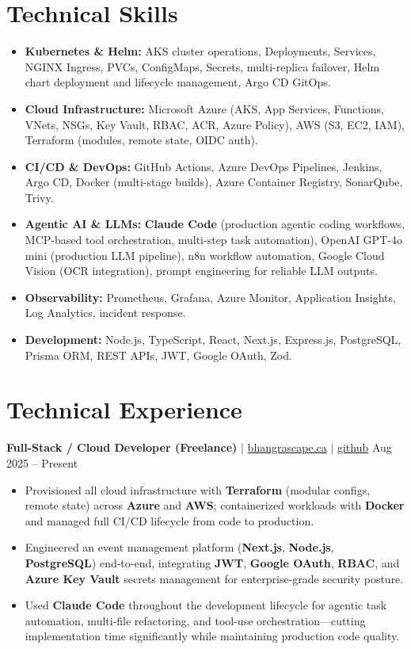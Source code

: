 \documentclass[11pt,a4paper]{article}
\begin{document}
\section{Technical Skills}
\begin{itemize}
    \item \textbf{Kubernetes \& Helm:} AKS cluster operations, Deployments, Services, NGINX Ingress, PVCs, ConfigMaps, Secrets, multi-replica failover, Helm chart deployment and lifecycle management, Argo CD GitOps.
    \item \textbf{Cloud Infrastructure:} Microsoft Azure (AKS, App Services, Functions, VNets, NSGs, Key Vault, RBAC, ACR, Azure Policy), AWS (S3, EC2, IAM), Terraform (modules, remote state, OIDC auth).
    \item \textbf{CI/CD \& DevOps:} GitHub Actions, Azure DevOps Pipelines, Jenkins, Argo CD, Docker (multi-stage builds), Azure Container Registry, SonarQube, Trivy.
    \item \textbf{Agentic AI \& LLMs:} \textbf{Claude Code} (production agentic coding workflows, MCP-based tool orchestration, multi-step task automation), OpenAI GPT-4o mini (production LLM pipeline), n8n workflow automation, Google Cloud Vision (OCR integration), prompt engineering for reliable LLM outputs.
    \item \textbf{Observability:} Prometheus, Grafana, Azure Monitor, Application Insights, Log Analytics, incident response.
    \item \textbf{Development:} Node.js, TypeScript, React, Next.js, Express.js, PostgreSQL, Prisma ORM, REST APIs, JWT, Google OAuth, Zod.
\end{itemize}

\section{Technical Experience}

\textbf{Full-Stack / Cloud Developer (Freelance)} $|$ \href{https://bhangrascape.ca}{bhangrascape.ca} $|$ \href{https://github.com/bhat0155/bhangraescape}{\small github} \hfill Aug 2025 -- Present
\begin{itemize}
    \item Provisioned all cloud infrastructure with \textbf{Terraform} (modular configs, remote state) across \textbf{Azure} and \textbf{AWS}; containerized workloads with \textbf{Docker} and managed full CI/CD lifecycle from code to production.
    \item Engineered an event management platform (\textbf{Next.js}, \textbf{Node.js}, \textbf{PostgreSQL}) end-to-end, integrating \textbf{JWT}, \textbf{Google OAuth}, \textbf{RBAC}, and \textbf{Azure Key Vault} secrets management for enterprise-grade security posture.
    \item Used \textbf{Claude Code} throughout the development lifecycle for agentic task automation, multi-file refactoring, and tool-use orchestration---cutting implementation time significantly while maintaining production code quality.
\end{itemize}
\end{document}
